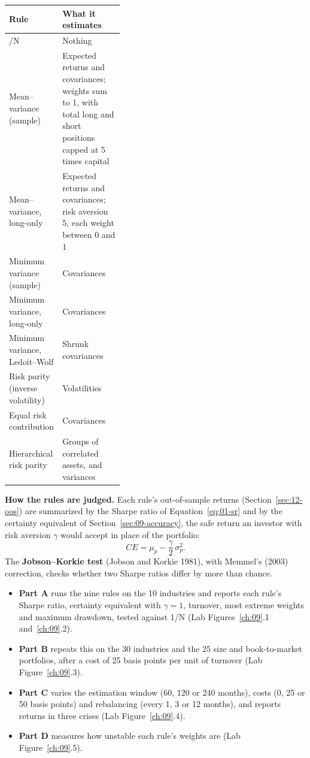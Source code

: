 \begin{center}
\small
\begin{tabularx}{0.9\linewidth}{@{}>{\raggedright\arraybackslash}p{0.38\linewidth}>{\raggedright\arraybackslash}X@{}}
\toprule
Rule & What it estimates \\
\midrule
1/N & Nothing \\
Mean--variance (sample) & Expected returns and covariances; weights sum to 1, with total long and short positions capped at 5 times capital \\
Mean--variance, long-only & Expected returns and covariances; risk aversion 5, each weight between 0 and 1 \\
Minimum variance (sample) & Covariances \\
Minimum variance, long-only & Covariances \\
Minimum variance, Ledoit--Wolf & Shrunk covariances \\
Risk parity (inverse volatility) & Volatilities \\
Equal risk contribution & Covariances \\
Hierarchical risk parity & Groups of correlated assets, and variances \\
\bottomrule
\end{tabularx}
\end{center}

\textbf{How the rules are judged.} Each rule's out-of-sample returns (Section~\ref{sec:12-oos}) are summarized by the Sharpe ratio of Equation~\eqref{eq:01-sr} and by the certainty equivalent of Section~\ref{sec:09-accuracy}, the safe return an investor with risk aversion $\gamma$ would accept in place of the portfolio:
\begin{equation}
  CE = \mu_p - \frac{\gamma}{2}\,\sigma_p^2.
  \label{eq:12-ce}
\end{equation}
The \textbf{Jobson--Korkie test} (Jobson and Korkie 1981), with Memmel's (2003) correction, checks whether two Sharpe ratios differ by more than chance.

\begin{itemize}
  \item \textbf{Part A} runs the nine rules on the 10 industries and reports each rule's Sharpe ratio, certainty equivalent with $\gamma = 1$, turnover, most extreme weights and maximum drawdown, tested against 1/N (Lab Figures~\ref{ch:09}.1 and~\ref{ch:09}.2).
  \item \textbf{Part B} repeats this on the 30 industries and the 25 size and book-to-market portfolios, after a cost of 25 basis points per unit of turnover (Lab Figure~\ref{ch:09}.3).
  \item \textbf{Part C} varies the estimation window (60, 120 or 240 months), costs (0, 25 or 50 basis points) and rebalancing (every 1, 3 or 12 months), and reports returns in three crises (Lab Figure~\ref{ch:09}.4).
  \item \textbf{Part D} measures how unstable each rule's weights are (Lab Figure~\ref{ch:09}.5).
\end{itemize}

